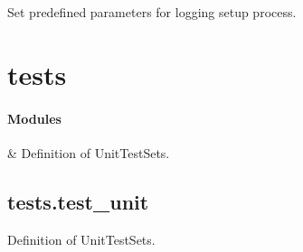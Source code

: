 \documentclass[letterpaper,10pt,english]{sphinxmanual}
\begin{document}
\begin{fulllineitems}
\label{\detokenize{_autosummary/functionfinder.setuplog.set_setuplogging:functionfinder.setuplog.set_setuplogging}}
\pysigstartsignatures
{}
\pysigstopsignatures
\sphinxAtStartPar
Set predefined parameters for logging setup process.

\end{fulllineitems}


\sphinxstepscope


\chapter{tests}
\label{\detokenize{_autosummary/tests:module-tests}}\label{\detokenize{_autosummary/tests:tests}}\label{\detokenize{_autosummary/tests::doc}}\subsubsection*{Modules}


\begin{savenotes}\sphinxattablestart
\sphinxthistablewithglobalstyle
\sphinxthistablewithnovlinesstyle
\centering
\begin{tabulary}{\linewidth}[t]{}
\sphinxtoprule
\sphinxtableatstartofbodyhook
\sphinxAtStartPar
{\hyperref[\detokenize{_autosummary/tests.test_unit:module-tests.test_unit}]{}}
&
\sphinxAtStartPar
Definition of UnitTest\sphinxhyphen{}Sets.
\\
\sphinxbottomrule
\end{tabulary}
\sphinxtableafterendhook\par
\sphinxattableend\end{savenotes}

\sphinxstepscope


\section{tests.test\_unit}
\label{\detokenize{_autosummary/tests.test_unit:module-tests.test_unit}}\label{\detokenize{_autosummary/tests.test_unit:tests-test-unit}}\label{\detokenize{_autosummary/tests.test_unit::doc}}
\sphinxAtStartPar
Definition of UnitTest\sphinxhyphen{}Sets.
\end{document}
